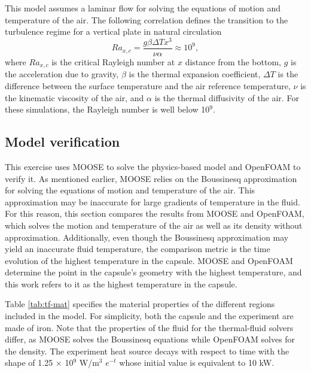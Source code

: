 This model assumes a laminar flow for solving the equations of motion and temperature of the air.
The following correlation defines the transition to the turbulence regime for a vertical plate in natural circulation \cite{incropera_fundamentals_2006}
\begin{equation}
Ra_{x,c} = \frac{g \beta \Delta T x^3}{\nu \alpha} \approx 10^9,
\end{equation}
where $Ra_{x,c}$ is the critical Rayleigh number at $x$ distance from the bottom, $g$ is the acceleration due to gravity, $\beta$ is the thermal expansion coefficient, $\Delta T$ is the difference between the surface temperature and the air reference temperature, $\nu$ is the kinematic viscosity of the air, and $\alpha$ is the thermal diffusivity of the air.
For these simulations, the Rayleigh number is well below 10$^9$.


\subsection{Model verification}

This exercise uses MOOSE to solve the physics-based model and OpenFOAM to verify it.
As mentioned earlier, MOOSE relies on the Boussinesq approximation for solving the equations of motion and temperature of the air.
This approximation may be inaccurate for large gradients of temperature in the fluid.
For this reason, this section compares the results from MOOSE and OpenFOAM, which solves the motion and temperature of the air as well as its density without approximation.
Additionally, even though the Boussinesq approximation may yield an inaccurate fluid temperature, the comparison metric is the time evolution of the highest temperature in the capsule.
MOOSE and OpenFOAM determine the point in the capsule's geometry with the highest temperature, and this work refers to it as the highest temperature in the capsule.

Table \ref{tab:tf-mat} specifies the material properties of the different regions included in the model.
For simplicity, both the capsule and the experiment are made of iron.
Note that the properties of the fluid for the thermal-fluid solvers differ, as MOOSE solves the Boussinesq equations while OpenFOAM solves for the density.
The experiment heat source decays with respect to time with the shape of 1.25 $\times$ 10$^9$ W/m$^3$ $e^{-t}$ whose initial value is equivalent to 10 kW.

